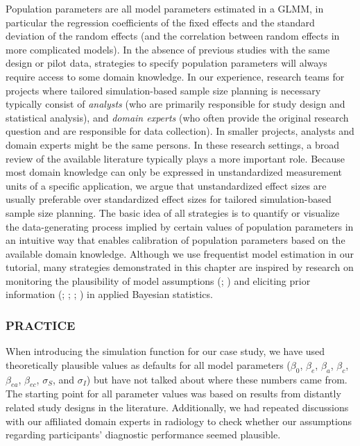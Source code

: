 \documentclass[
  man,
  floatsintext,
  longtable,
  a4paper,
  nolmodern,
  notxfonts,
  notimes,
  colorlinks=true,linkcolor=blue,citecolor=blue,urlcolor=blue]{apa7}
\begin{document}
Population parameters are all model parameters estimated in a GLMM, in
particular the regression coefficients of the fixed effects and the
standard deviation of the random effects (and the correlation between
random effects in more complicated models). In the absence of previous
studies with the same design or pilot data, strategies to specify
population parameters will always require access to some domain
knowledge. In our experience, research teams for projects where tailored
simulation-based sample size planning is necessary typically consist of
\emph{analysts} (who are primarily responsible for study design and
statistical analysis), and \emph{domain experts} (who often provide the
original research question and are responsible for data collection). In
smaller projects, analysts and domain experts might be the same persons.
In these research settings, a broad review of the available literature
typically plays a more important role. Because most domain knowledge can
only be expressed in unstandardized measurement units of a specific
application, we argue that unstandardized effect sizes are usually
preferable over standardized effect sizes for tailored simulation-based
sample size planning. The basic idea of all strategies is to quantify or
visualize the data-generating process implied by certain values of
population parameters in an intuitive way that enables calibration of
population parameters based on the available domain knowledge. Although
we use frequentist model estimation in our tutorial, many strategies
demonstrated in this chapter are inspired by research on monitoring the
plausibility of model assumptions
(;
)
and eliciting prior information
(; ;
; ) in applied Bayesian statistics.

\subsubsection{PRACTICE}\label{practice-2}

When introducing the simulation function for our case study, we have
used theoretically plausible values as defaults for all model parameters
(\(\beta_0\), \(\beta_e\), \(\beta_a\), \(\beta_c\), \(\beta_{ea}\),
\(\beta_{ec}\), \(\sigma_S\), and \(\sigma_I\)) but have not talked
about where these numbers came from. The starting point for all
parameter values was based on results from distantly related study
designs in the literature. Additionally, we had repeated discussions
with our affiliated domain experts in radiology to check whether our
assumptions regarding participants' diagnostic performance seemed
plausible.
\end{document}
